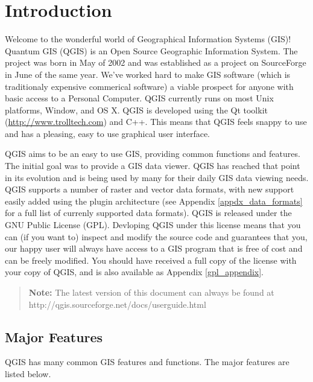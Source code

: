 
\chapter{Introduction}

Welcome to the wonderful world of Geographical Information Systems (GIS)!
Quantum GIS (QGIS) is an Open Source Geographic Information System. The project
was born in May of 2002 and was established as a project on SourceForge in June
of the same year. We've worked hard to make GIS software (which is traditionaly
expensive commerical software) a viable prospect for anyone with basic access
to a Personal Computer. QGIS currently runs on most Unix platforms, Window, and
OS X. QGIS is developed using the Qt toolkit (\url{http://www.trolltech.com})
and C++. This means that QGIS feels snappy to use and has a pleasing, easy to
use graphical user interface. 

QGIS aims to be an easy to use GIS, providing common functions and features.
The initial goal was to provide a GIS data viewer. QGIS has reached that point
in its evolution and is being used by many for their daily GIS data viewing
needs. QGIS supports a number of raster and vector data formats, with new
support easily added using the plugin architecture (see Appendix
\ref{appdx_data_formats} for a full list of currenly supported data formats).
QGIS is released under the GNU Public License (GPL). Devloping QGIS under this
license means that you can (if you want to) inspect and modify the source code
and guarantees that you, our happy user will always have access to a GIS
program that is free of cost and can be freely modified. You should have
received a full copy of the license with your copy of QGIS, and is also
available as Appendix \ref{gpl_appendix}.  
\begin{quote}
\begin{center}
\textbf{Note:} The latest version of this document can always be found at \newline
http://qgis.sourceforge.net/docs/userguide.html 
\end{center}
\end{quote}

\section{Major Features}

QGIS has many common GIS features and functions. The major features
are listed below. 

